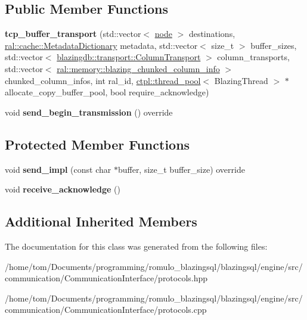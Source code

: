 \subsection*{Public Member Functions}
\begin{DoxyCompactItemize}
\item 
\mbox{\label{classcomm_1_1tcp__buffer__transport_a612b73b9fd1cc8fc656e6073bf25bd4e}} 
{\bfseries tcp\+\_\+buffer\+\_\+transport} (std\+::vector$<$ \hyperlink{classcomm_1_1node}{node} $>$ destinations, \hyperlink{classral_1_1cache_1_1MetadataDictionary}{ral\+::cache\+::\+Metadata\+Dictionary} metadata, std\+::vector$<$ size\+\_\+t $>$ buffer\+\_\+sizes, std\+::vector$<$ \hyperlink{structblazingdb_1_1transport_1_1ColumnTransport}{blazingdb\+::transport\+::\+Column\+Transport} $>$ column\+\_\+transports, std\+::vector$<$ \hyperlink{structral_1_1memory_1_1blazing__chunked__column__info}{ral\+::memory\+::blazing\+\_\+chunked\+\_\+column\+\_\+info} $>$ chunked\+\_\+column\+\_\+infos, int ral\+\_\+id, \hyperlink{classctpl_1_1thread__pool}{ctpl\+::thread\+\_\+pool}$<$ Blazing\+Thread $>$ $\ast$allocate\+\_\+copy\+\_\+buffer\+\_\+pool, bool require\+\_\+acknowledge)
\item 
\mbox{\label{classcomm_1_1tcp__buffer__transport_aa2a4513884e0e8e6b9996bb800d12dcf}} 
void {\bfseries send\+\_\+begin\+\_\+transmission} () override
\end{DoxyCompactItemize}
\subsection*{Protected Member Functions}
\begin{DoxyCompactItemize}
\item 
\mbox{\label{classcomm_1_1tcp__buffer__transport_a1b9b0e80fbdf55c5217446ad025b47bd}} 
void {\bfseries send\+\_\+impl} (const char $\ast$buffer, size\+\_\+t buffer\+\_\+size) override
\item 
\mbox{\label{classcomm_1_1tcp__buffer__transport_a55d958a8177cb50981ca4e615a2e5669}} 
void {\bfseries receive\+\_\+acknowledge} ()
\end{DoxyCompactItemize}
\subsection*{Additional Inherited Members}


The documentation for this class was generated from the following files\+:\begin{DoxyCompactItemize}
\item 
/home/tom/\+Documents/programming/romulo\+\_\+blazingsql/blazingsql/engine/src/communication/\+Communication\+Interface/protocols.\+hpp\item 
/home/tom/\+Documents/programming/romulo\+\_\+blazingsql/blazingsql/engine/src/communication/\+Communication\+Interface/protocols.\+cpp\end{DoxyCompactItemize}
